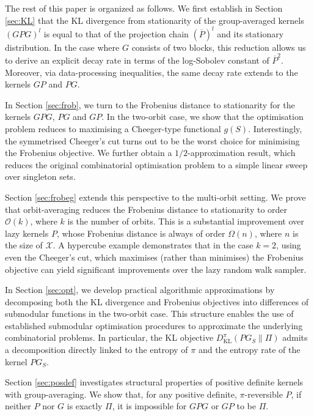 \documentclass[EJP]{ejpecp} %
\begin{document}
The rest of this paper is organized as follows. We first establish in Section \ref{sec:KL} that the KL divergence from stationarity of the group-averaged kernels $(GPG)^l$ is equal to that of the projection chain $(\overline{P})^l$ and its stationary distribution. In the case where $G$ consists of two blocks, this reduction allows us to derive an explicit decay rate in terms of the log-Sobolev constant of $\overline{P}^2$. Moreover, via data-processing inequalities, the same decay rate extends to the kernels $GP$ and $PG$.

In Section \ref{sec:frob}, we turn to the Frobenius distance to stationarity for the kernels $GPG$, $PG$ and $GP$. In the two-orbit case, we show that the optimisation problem reduces to maximising a Cheeger-type functional $g(S).$ Interestingly, the symmetrised Cheeger's cut turns out to be the worst choice for minimising the Frobenius objective. We further obtain a $1/2$-approximation result, which reduces the original combinatorial optimisation problem to a simple linear sweep over singleton sets.

Section \ref{sec:frobeg} extends this perspective to the multi-orbit setting. We prove that orbit-averaging reduces the Frobenius distance to stationarity to order $\mathcal{O}(k)$, where $k$ is the number of orbits. This is a substantial improvement over lazy kernels $P$, whose Frobenius distance is always of order $\Omega(n)$, where $n$ is the size of $\mathcal{X}$. A hypercube example demonstrates that in the case $k=2$, using even the Cheeger's cut, which maximises (rather than minimises) the Frobenius objective can yield significant improvements over the lazy random walk sampler.

In Section \ref{sec:opt}, we develop practical algorithmic approximations by decomposing both the KL divergence and Frobenius objectives into differences of submodular functions in the two-orbit case. This structure enables the use of established submodular optimisation procedures to approximate the underlying combinatorial problems. In particular, the KL objective $ D_{\mathrm{KL}}^\pi(PG_S \| \Pi)$ admits a decomposition directly linked to the entropy of 
$\pi$ and the entropy rate of the kernel $PG_S.$

Section \ref{sec:posdef} investigates structural properties of positive definite kernels with group-averaging. We show that, for any positive definite, $\pi$-reversible $P$, if neither $P$ nor $G$ is exactly $\Pi$, it is impossible for $GPG$ or $GP$ to be $\Pi.$
\end{document}
